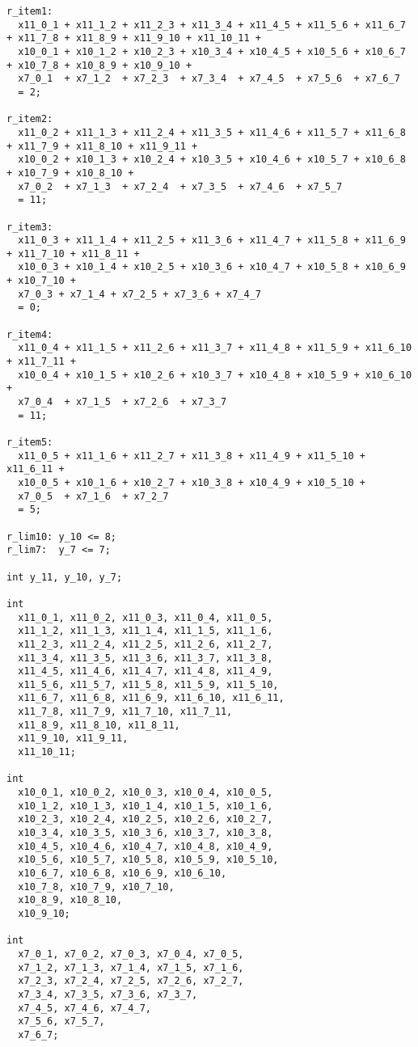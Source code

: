 \documentclass[a4paper,12pt]{article}
\begin{document}
\begin{lstlisting}
r_item1:
  x11_0_1 + x11_1_2 + x11_2_3 + x11_3_4 + x11_4_5 + x11_5_6 + x11_6_7 + x11_7_8 + x11_8_9 + x11_9_10 + x11_10_11 +
  x10_0_1 + x10_1_2 + x10_2_3 + x10_3_4 + x10_4_5 + x10_5_6 + x10_6_7 + x10_7_8 + x10_8_9 + x10_9_10 +
  x7_0_1  + x7_1_2  + x7_2_3  + x7_3_4  + x7_4_5  + x7_5_6  + x7_6_7
  = 2;

r_item2:
  x11_0_2 + x11_1_3 + x11_2_4 + x11_3_5 + x11_4_6 + x11_5_7 + x11_6_8 + x11_7_9 + x11_8_10 + x11_9_11 +
  x10_0_2 + x10_1_3 + x10_2_4 + x10_3_5 + x10_4_6 + x10_5_7 + x10_6_8 + x10_7_9 + x10_8_10 +
  x7_0_2  + x7_1_3  + x7_2_4  + x7_3_5  + x7_4_6  + x7_5_7
  = 11;

r_item3:
  x11_0_3 + x11_1_4 + x11_2_5 + x11_3_6 + x11_4_7 + x11_5_8 + x11_6_9 + x11_7_10 + x11_8_11 +
  x10_0_3 + x10_1_4 + x10_2_5 + x10_3_6 + x10_4_7 + x10_5_8 + x10_6_9 + x10_7_10 +
  x7_0_3 + x7_1_4 + x7_2_5 + x7_3_6 + x7_4_7
  = 0;

r_item4:
  x11_0_4 + x11_1_5 + x11_2_6 + x11_3_7 + x11_4_8 + x11_5_9 + x11_6_10 + x11_7_11 +
  x10_0_4 + x10_1_5 + x10_2_6 + x10_3_7 + x10_4_8 + x10_5_9 + x10_6_10 +
  x7_0_4  + x7_1_5  + x7_2_6  + x7_3_7
  = 11;

r_item5:
  x11_0_5 + x11_1_6 + x11_2_7 + x11_3_8 + x11_4_9 + x11_5_10 + x11_6_11 +
  x10_0_5 + x10_1_6 + x10_2_7 + x10_3_8 + x10_4_9 + x10_5_10 +
  x7_0_5  + x7_1_6  + x7_2_7
  = 5;

r_lim10: y_10 <= 8;
r_lim7:  y_7 <= 7;

int y_11, y_10, y_7;

int
  x11_0_1, x11_0_2, x11_0_3, x11_0_4, x11_0_5,
  x11_1_2, x11_1_3, x11_1_4, x11_1_5, x11_1_6,
  x11_2_3, x11_2_4, x11_2_5, x11_2_6, x11_2_7,
  x11_3_4, x11_3_5, x11_3_6, x11_3_7, x11_3_8,
  x11_4_5, x11_4_6, x11_4_7, x11_4_8, x11_4_9,
  x11_5_6, x11_5_7, x11_5_8, x11_5_9, x11_5_10,
  x11_6_7, x11_6_8, x11_6_9, x11_6_10, x11_6_11,
  x11_7_8, x11_7_9, x11_7_10, x11_7_11,
  x11_8_9, x11_8_10, x11_8_11,
  x11_9_10, x11_9_11,
  x11_10_11;

int
  x10_0_1, x10_0_2, x10_0_3, x10_0_4, x10_0_5,
  x10_1_2, x10_1_3, x10_1_4, x10_1_5, x10_1_6,
  x10_2_3, x10_2_4, x10_2_5, x10_2_6, x10_2_7,
  x10_3_4, x10_3_5, x10_3_6, x10_3_7, x10_3_8,
  x10_4_5, x10_4_6, x10_4_7, x10_4_8, x10_4_9,
  x10_5_6, x10_5_7, x10_5_8, x10_5_9, x10_5_10,
  x10_6_7, x10_6_8, x10_6_9, x10_6_10,
  x10_7_8, x10_7_9, x10_7_10,
  x10_8_9, x10_8_10,
  x10_9_10;

int
  x7_0_1, x7_0_2, x7_0_3, x7_0_4, x7_0_5,
  x7_1_2, x7_1_3, x7_1_4, x7_1_5, x7_1_6,
  x7_2_3, x7_2_4, x7_2_5, x7_2_6, x7_2_7,
  x7_3_4, x7_3_5, x7_3_6, x7_3_7,
  x7_4_5, x7_4_6, x7_4_7,
  x7_5_6, x7_5_7,
  x7_6_7;
\end{lstlisting}
\end{document}
